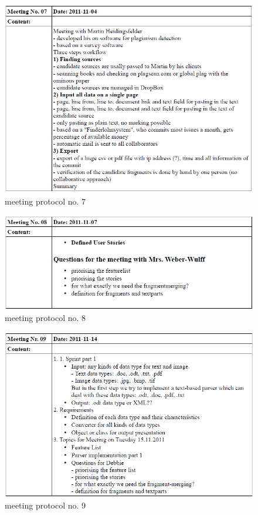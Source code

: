 \begin{appendix}
\begin{figure}[htbp]
  \centering
    \includegraphics[width=\textwidth]{images/a_meetings/meeting_07.png}
  \caption{meeting protocol no. 7}
  \label{fig:meeting protocol no. 7}
\end{figure}

\begin{figure}[htbp]
  \centering
    \includegraphics[width=\textwidth]{images/a_meetings/meeting_08.png}
  \caption{meeting protocol no. 8}
  \label{fig:meeting protocol no. 8}
\end{figure}

\begin{figure}[htbp]
  \centering
    \includegraphics[width=\textwidth]{images/a_meetings/meeting_09.png}
  \caption{meeting protocol no. 9}
  \label{fig:meeting protocol no. 9}
\end{figure}


\end{appendix}
